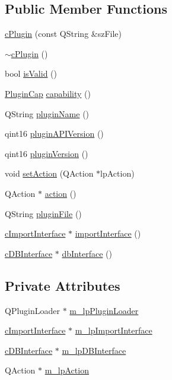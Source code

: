\subsection*{Public Member Functions}
\begin{DoxyCompactItemize}
\item 
\hyperlink{classc_plugin_af11276446078e0e68e00b7c139bca1bb}{c\+Plugin} (const Q\+String \&sz\+File)
\item 
\hyperlink{classc_plugin_a38d0e25a6bcd3207902799b783212287}{$\sim$c\+Plugin} ()
\item 
bool \hyperlink{classc_plugin_a6bb35e1ecaf5e8f3d40b377d29f873e0}{is\+Valid} ()
\item 
\hyperlink{classc_plugin_a4e67238bd5463a402138f35714d03737}{Plugin\+Cap} \hyperlink{classc_plugin_a4e1ee6c29cb94d72b8ddc222dd1e4d5a}{capability} ()
\item 
Q\+String \hyperlink{classc_plugin_a73b42f8c99d83faa8a2fe3ed994937a1}{plugin\+Name} ()
\item 
qint16 \hyperlink{classc_plugin_a1055ecf4ff0d670e34291e3d5cc48d90}{plugin\+A\+P\+I\+Version} ()
\item 
qint16 \hyperlink{classc_plugin_a87bb0058c550e53f528e1197b5f6ac55}{plugin\+Version} ()
\item 
void \hyperlink{classc_plugin_a9e0a7486edcc64646d9b17686863d2e8}{set\+Action} (Q\+Action $\ast$lp\+Action)
\item 
Q\+Action $\ast$ \hyperlink{classc_plugin_a26a73caae5c73d08186e0f969d5851ee}{action} ()
\item 
Q\+String \hyperlink{classc_plugin_a2fccccf8d24d54ddc9a752f1c7332c55}{plugin\+File} ()
\item 
\hyperlink{classc_import_interface}{c\+Import\+Interface} $\ast$ \hyperlink{classc_plugin_ac4069636d1b3b0bf5bfa10d6c96ee097}{import\+Interface} ()
\item 
\hyperlink{classc_d_b_interface}{c\+D\+B\+Interface} $\ast$ \hyperlink{classc_plugin_ac2fbd0510573398caf3f5da68da327bb}{db\+Interface} ()
\end{DoxyCompactItemize}
\subsection*{Private Attributes}
\begin{DoxyCompactItemize}
\item 
Q\+Plugin\+Loader $\ast$ \hyperlink{classc_plugin_a48d7a4870299a7fc61375eb84e791d04}{m\+\_\+lp\+Plugin\+Loader}
\item 
\hyperlink{classc_import_interface}{c\+Import\+Interface} $\ast$ \hyperlink{classc_plugin_a1f8cbfdab1de2df03c301d45ea286be1}{m\+\_\+lp\+Import\+Interface}
\item 
\hyperlink{classc_d_b_interface}{c\+D\+B\+Interface} $\ast$ \hyperlink{classc_plugin_a0dfe0fca935254e9c8e10766ebbd8cd1}{m\+\_\+lp\+D\+B\+Interface}
\item 
Q\+Action $\ast$ \hyperlink{classc_plugin_afb4ff0636dc58684867383cbf8408231}{m\+\_\+lp\+Action}
\end{DoxyCompactItemize}


